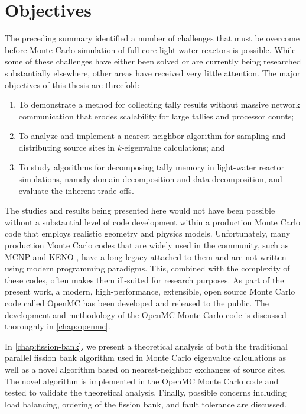 \section{Objectives}

The preceding summary identified a number of challenges that must be overcome
before Monte Carlo simulation of full-core light-water reactors is
possible. While some of these challenges have either been solved or are
currently being researched substantially elsewhere, other areas have received
very little attention. The major objectives of this thesis are threefold:
\begin{enumerate}
\item To demonstrate a method for collecting tally results without massive
  network communication that erodes scalability for large tallies and processor
  counts;
\item To analyze and implement a nearest-neighbor algorithm for sampling and
  distributing source sites in $k$-eigenvalue calculations; and
\item To study algorithms for decomposing tally memory in light-water reactor
  simulations, namely domain decomposition and data decomposition, and evaluate
  the inherent trade-offs.
\end{enumerate}

The studies and results being presented here would not have been possible
without a substantial level of code development within a production Monte Carlo
code that employs realistic geometry and physics models. Unfortunately, many
production Monte Carlo codes that are widely used in the community, such as MCNP
and KENO \cite{ornl-petrie-1990}, have a long legacy attached to them and are
not written using modern programming paradigms. This, combined with the
complexity of these codes, often makes them ill-suited for research purposes. As
part of the present work, a modern, high-performance, extensible, open source
Monte Carlo code called OpenMC has been developed and released to the
public. The development and methodology of the OpenMC Monte Carlo code is
discussed thoroughly in \autoref{chap:openmc}.

In \autoref{chap:fission-bank}, we present a theoretical analysis of both the
traditional parallel fission bank algorithm used in Monte Carlo eigenvalue
calculations as well as a novel algorithm based on nearest-neighbor exchanges of
source sites. The novel algorithm is implemented in the OpenMC Monte Carlo code
and tested to validate the theoretical analysis. Finally, possible concerns
including load balancing, ordering of the fission bank, and fault tolerance are
discussed.

